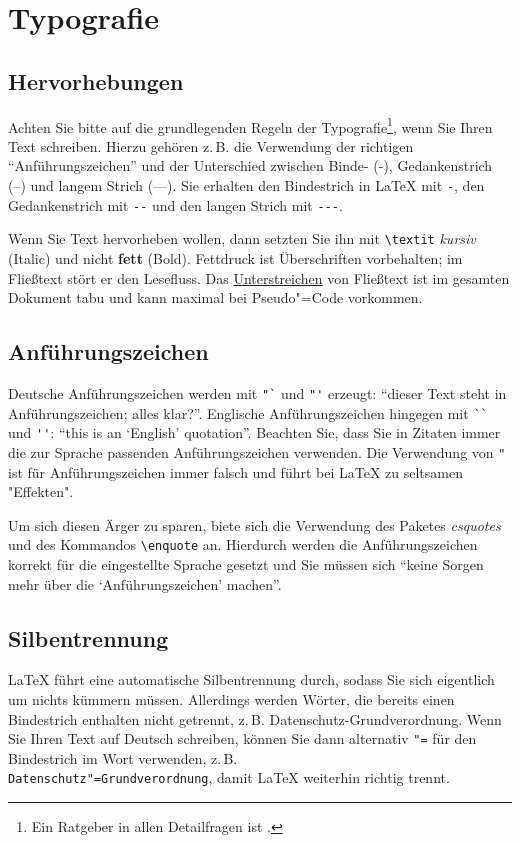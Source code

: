 \chapter{Typografie}

\section{Hervorhebungen}
\label{Einleitung:Textauszeichnungen}

Achten Sie bitte auf die grundlegenden Regeln der Typografie\footnote{Ein Ratgeber in allen Detailfragen ist \cite{Forssman2002}.}, wenn Sie Ihren Text schreiben. Hierzu gehören z.\,B. die Verwendung der richtigen "`Anführungszeichen"' und der Unterschied zwischen Binde- (-), Gedankenstrich (--) und langem Strich (---). Sie erhalten den Bindestrich in \LaTeX{} mit \verb+-+, den Gedankenstrich mit \verb+--+ und den langen Strich mit \verb+---+.

Wenn Sie Text hervorheben wollen, dann setzten Sie ihn mit \verb+\textit+ \textit{kursiv} (Italic) und nicht \textbf{fett} (Bold). Fettdruck ist Überschriften vorbehalten; im Fließtext stört er den Lesefluss. Das \underline{Unterstreichen} von Fließtext ist im gesamten Dokument tabu und kann maximal bei Pseudo"=Code vorkommen.


\section{Anführungszeichen}

Deutsche Anführungszeichen werden mit \verb+"`+ und \verb+"'+ erzeugt: "`dieser Text steht in \glq Anführungszeichen\grq; alles klar?"'. Englische Anführungszeichen hingegen mit \verb+``+ und \verb+''+: ``this is an `English' quotation''. Beachten Sie, dass Sie in Zitaten immer die zur Sprache passenden Anführungszeichen verwenden. Die Verwendung von \verb+"+ ist für Anführungszeichen immer falsch und führt bei \LaTeX{} zu seltsamen "Effekten".

Um sich diesen Ärger zu sparen, biete sich die Verwendung des Paketes \textit{csquotes} und des Kommandos \verb+\enquote+ an. Hierdurch werden die Anführungszeichen korrekt für die eingestellte Sprache gesetzt und Sie müssen sich \enquote{keine Sorgen mehr über die \enquote{Anführungszeichen} machen}.


\section{Silbentrennung}
\LaTeX{} führt eine automatische Silbentrennung durch, sodass Sie sich eigentlich um nichts kümmern müssen. Allerdings werden Wörter, die bereits einen Bindestrich enthalten nicht getrennt, z.\,B. Datenschutz-Grundverordnung. Wenn Sie Ihren Text auf Deutsch schreiben, können Sie dann alternativ \verb+"=+ für den Bindestrich im Wort verwenden, z.\,B. \\
\verb+Datenschutz"=Grundverordnung+, damit \LaTeX{} weiterhin richtig trennt.

